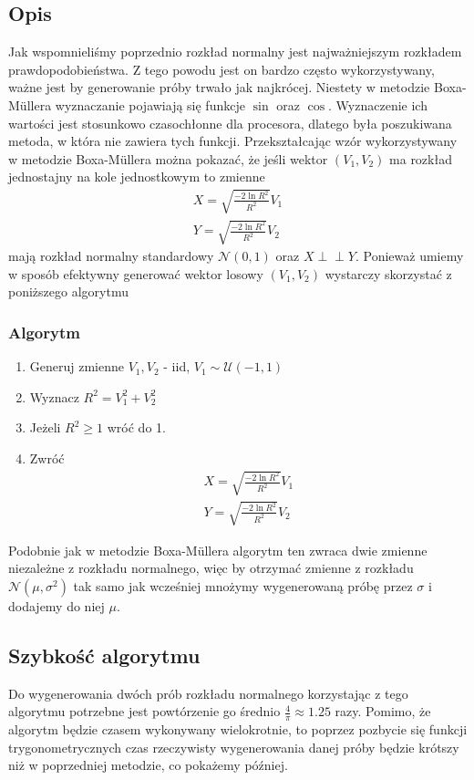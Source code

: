 \documentclass[12pt]{mwrep}
\newcommand{\indep}{\perp \!\!\! \perp}
\begin{document}
	\subsection{Opis}
	\noindent Jak wspomnieliśmy poprzednio rozkład normalny jest najważniejszym rozkładem prawdopodobieństwa. Z tego powodu jest on bardzo często wykorzystywany, ważne jest by generowanie próby trwało jak najkrócej. Niestety w metodzie Boxa-M{\"u}llera wyznaczanie pojawiają się funkcje $\sin$ oraz $\cos$. Wyznaczenie ich wartości jest stosunkowo czasochłonne dla procesora, dlatego była poszukiwana metoda, w która nie zawiera tych funkcji. Przekształcając wzór wykorzystywany w metodzie Boxa-M\"ullera można pokazać, że jeśli wektor $(V_1, V_2)$ ma rozkład jednostajny na kole jednostkowym to zmienne
	\begin{equation}
		\begin{split}
			X=\sqrt{\frac{-2\ln R^2}{R^2}}V_1\\
			Y=\sqrt{\frac{-2\ln R^2}{R^2}}V_2
		\end{split}
	\end{equation}
	mają rozkład normalny standardowy $\mathcal{N}(0,1)$ oraz $X \indep Y$. Ponieważ umiemy w sposób efektywny generować wektor losowy $(V_1, V_2)$ wystarczy skorzystać z poniższego algorytmu
	\subsubsection{Algorytm}
	\begin{enumerate}[leftmargin=10mm]
		\item Generuj zmienne $V_1, V_2$ - iid, $V_1\sim\mathcal{U}(-1,1)$
		\item Wyznacz $R^2=V_1^2+V_2^2$
		\item Jeżeli $R^2\ge 1$ wróć do 1.
		\item Zwróć
		\begin{equation}
			\begin{split}
				X=\sqrt{\frac{-2\ln R^2}{R^2}}V_1\\
				Y=\sqrt{\frac{-2\ln R^2}{R^2}}V_2
			\end{split}
		\end{equation}
	\end{enumerate}
	Podobnie jak w metodzie Boxa-M{\"u}llera algorytm ten zwraca dwie zmienne niezależne z rozkładu normalnego, więc by otrzymać zmienne z rozkładu $\mathcal{N}(\mu,\sigma^2)$ tak samo jak wcześniej mnożymy wygenerowaną próbę przez $\sigma$ i dodajemy do niej $\mu$.
	
	\subsection{Szybkość algorytmu}
	\noindent Do wygenerowania dwóch prób rozkładu normalnego korzystając z tego algorytmu potrzebne jest powtórzenie go średnio $\frac{4}{\pi}\approx1.25$ razy. Pomimo, że algorytm będzie czasem wykonywany wielokrotnie, to poprzez pozbycie się funkcji trygonometrycznych czas rzeczywisty wygenerowania danej próby będzie krótszy niż w poprzedniej metodzie, co pokażemy później.
	
\end{document}
